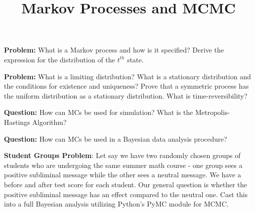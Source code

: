 




\title{Markov Processes and MCMC}
\date{}
\maketitle

\textbf{Problem:} What is a Markov process and how is it specified? Derive the expression for the distribution of the $t^{th}$ state.\n

\textbf{Problem:} What is a limiting distribution? What is a stationary distribution and the conditions for existence and uniqueness? Prove that a symmetric process has the uniform distribution as a stationary distribution. What is time-reversibility?\n

\textbf{Question:} How can MCs be used for simulation? What is the Metropolis-Hastings Algorithm?\n

\textbf{Question:} How can MCs be used in a Bayesian data analysis procedure?\n

\textbf{Student Groups Problem}: Let say we have two randomly chosen groups of students who are undergoing the same summer math course - one group sees a positive subliminal message while the other sees a neutral message. We have a before and after test score for each student. Our general question is whether the positive subliminal message has an effect compared to the neutral one. Cast this into a full Bayesian analysis utilizing Python's PyMC module for MCMC.

\vspace{.3 in}

\tableofcontents

